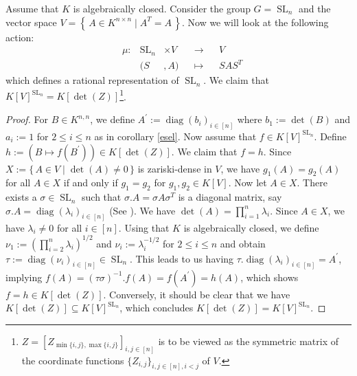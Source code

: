 \begin{dexample}\label{quad}
  Assume that $K$ is algebraically closed.
  Consider the group $G = \operatorname{SL}_n$ and the vector space $ V = \left\{ \, A \in K^{n \times n} \mid A^T = A \, \right\} $.
  Now we will look at the following action:
  \begin{equation}
    \begin{aligned}
      &\mu \colon & \operatorname{SL}_n &\times  V&&  \longrightarrow  &&V \\
      && (  S  &,   A  )  &&\longmapsto&&  SAS^T
    \end{aligned}
  \end{equation}
  which defines a rational representation of $\operatorname{SL}_n$.
  We claim that \linebreak$K[V]^{\operatorname{SL}_n} = K[\operatorname{det}(Z)]$\footnote{$Z = [Z_{\operatorname{min}\{i,j\},\operatorname{max}\{i,j\}}]_{i,j \in [n]}$ is to be viewed as the symmetric matrix of the coordinate functions $\{Z_{i,j}\}_{i,j \in[n],i<j}$ of $V$.}.
\end{dexample}
\begin{proof}
  For $B \in K^{n,n}$, we define $A^\prime := \operatorname{diag}(b_i)_{i\in[n]}$ where $b_1 := \operatorname{det}(B)$ and $a_i := 1$ for $2\leq i\leq n$ as in corollary \ref{esel}.
  Now assume that $f \in K[V]^{\operatorname{SL}_n}$.
  Define \linebreak$h := (B \mapsto f(B^\prime)) \in K[\operatorname{det}(Z)]$.
  We claim that $f = h$.
  Since \linebreak$X := \{\, A \in V \mid \operatorname{det}(A) \neq 0 \,\}$ is zariski-dense in $V$, we have $g_1(A) = g_2(A)$ for all $A \in X$ if and only if $g_1 = g_2$ for $g_1,g_2 \in K[V]$.
  Now let $A \in X$.
  There exists a $\sigma \in \operatorname{SL}_n$ such that $\sigma .A = \sigma A \sigma^T$ is a diagonal matrix, say $\sigma.A = \operatorname{diag}(\lambda_i)_{i\in[n]}$ (See \cite[p.~325]{Fis14}).
  We have $\operatorname{det}(A) = \prod_{i=1}^n \lambda_i$.
  Since $A \in X$, we have $\lambda_i \neq 0$ for all $i \in [n]$.
  Using that $K$ is algebraically closed, we define $\nu_1 := \left(\prod_{i=2}^n \lambda_i \right)^{1/2}$ and $\nu_i := \lambda_i^{-1/2}$ for $2\leq i\leq n$ and obtain $\tau := \operatorname{diag}(\nu_i)_{i\in[n]} \in \operatorname{SL}_n$.
  This leads to us having $\tau.\operatorname{diag}(\lambda_i)_{i\in[n]} = A^\prime$, implying $f(A) = (\tau\sigma)^{-1}.f(A)  = f(A^\prime) = h(A)$, which shows $f = h \in K[\operatorname{det}(Z)]$.
  Conversely, it should be clear that we have $K[\operatorname{det}(Z)] \subseteq K[V]^{\operatorname{SL}_n}$, which concludes $K[\operatorname{det}(Z)] = K[V]^{\operatorname{SL}_n}$.
\end{proof}


